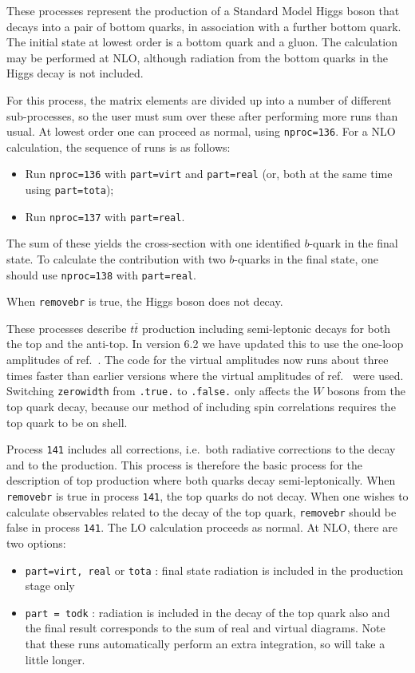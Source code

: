 These processes represent the production of a Standard Model Higgs
boson that decays into a pair of bottom quarks,
in association with a further bottom quark. The initial state at lowest order
is a bottom quark and a gluon.
The calculation may be performed at NLO, although radiation from the
bottom quarks in the Higgs decay is not included.

For this process, the matrix elements are divided up into a number of
different sub-processes, so the user must sum over these after performing
more runs than usual. At lowest order one can proceed as normal, using
{\tt nproc=136}. For a NLO calculation, the sequence of runs is as follows:
\begin{itemize}
\item Run {\tt nproc=136} with {\tt part=virt} and {\tt part=real} (or, both
at the same time using {\tt part=tota});
\item Run {\tt nproc=137} with {\tt part=real}.
\end{itemize}
The sum of these yields the cross-section with one identified $b$-quark in
the final state. To calculate the contribution with two $b$-quarks in the
final state, one should use {\tt nproc=138} with {\tt part=real}.

When {\tt removebr} is true, the Higgs boson does not decay.


\label{subsec:ttbar}

These processes describe $t \bar{t}$ production including semi-leptonic
decays for both the top and the anti-top. 
In version 6.2 we have updated this to use the one-loop amplitudes of
ref.~\cite{Badger:2011yu}. The code for the virtual amplitudes now runs
about three times faster than earlier versions where the virtual
amplitudes of ref.~\cite{Korner:2002hy} were used.  
Switching {\tt zerowidth} from {\tt .true.} to {\tt .false.} only affects 
the $W$ bosons from the top quark decay, because our method of including spin
correlations requires the top quark to be on shell.

Process {\tt 141} includes all corrections, i.e.\ both radiative corrections
to the decay and to the production. This process is therefore the
basic process for the description of top production where both quarks
decay semi-leptonically.  When {\tt removebr} is true in process {\tt 141},
the top quarks do not decay.
When one wishes to calculate observables related to the decay of the top
quark, {\tt removebr} should be false in process {\tt 141}.
The LO calculation proceeds as normal. 
At NLO, there are two options:
\begin{itemize}
\item {\tt part=virt, real} or {\tt tota} : final state radiation is included
in the production stage only
\item {\tt part = todk} : radiation is included in the decay of the top
quark also and the final result corresponds to the sum of real and virtual
diagrams. 
Note that these runs automatically perform an extra integration, so
will take a little longer.
\end{itemize}

